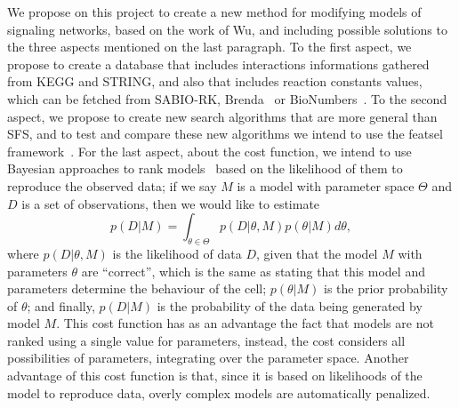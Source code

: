 We propose on this project to create a new method for modifying 
models of signaling networks, based on the work of Wu, and 
including possible solutions to the three aspects mentioned on the last 
paragraph. To the first aspect, we propose to create a database that 
includes interactions informations gathered from KEGG and STRING, and 
also that includes reaction constants values, which can be fetched from
SABIO-RK, Brenda~\cite{Schomburg2004} or BioNumbers~\cite{Milo2009}. To
the second aspect, we propose to create new search algorithms that are
more general than SFS, and to test and compare these new algorithms we
intend to use the featsel framework~\cite{REIS2017193}. For the last 
aspect, about the cost function, we intend to use Bayesian approaches to
rank models~\cite{Vyshemirsky2007} based on the likelihood of them to 
reproduce the observed data; if we say $M$ is a model with parameter 
space $\Theta$ and $D$ is a set of observations, then we would like to 
estimate 
\begin{equation*}
p (D|M) = \int_{\theta \in \Theta} p (D | \theta, M)p(\theta | M)d\theta, 
\end{equation*}
where $p (D|\theta, M)$ is the likelihood of data $D$, given that the
model $M$ with parameters $\theta$ are ``correct'', which is the same
as stating that this model and parameters determine the behaviour of the
cell; $p(\theta|M)$ is the prior probability of $\theta$; and finally, 
$p (D|M)$ is the probability 
of the data being generated by model $M$. This cost function has as an 
advantage the fact that models are not ranked using a single value for 
parameters, instead, the cost considers all possibilities of parameters, 
integrating over the parameter space. Another advantage of this cost 
function is that, since it is based on likelihoods of the model to 
reproduce data, overly complex models are automatically penalized.

